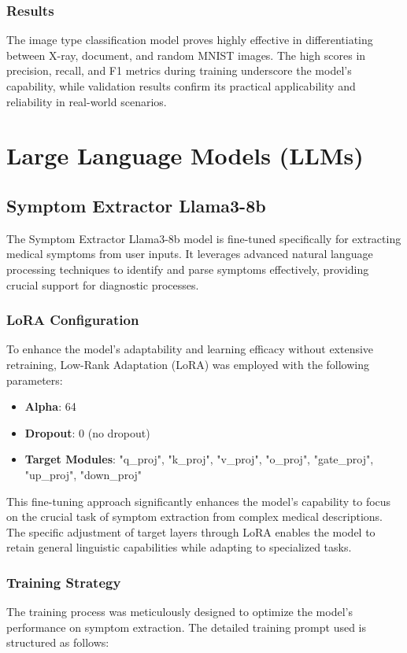 \subsubsection{Results}

The image type classification model proves highly effective in differentiating between X-ray, document, and random MNIST images. The high scores in precision, recall, and F1 metrics during training underscore the model's capability, while validation results confirm its practical applicability and reliability in real-world scenarios.

\section{Large Language Models (LLMs)}

\subsection{Symptom Extractor Llama3-8b}

The Symptom Extractor Llama3-8b model is fine-tuned specifically for extracting medical symptoms from user inputs. It leverages advanced natural language processing techniques to identify and parse symptoms effectively, providing crucial support for diagnostic processes.


\subsubsection{LoRA Configuration}
To enhance the model's adaptability and learning efficacy without extensive retraining, Low-Rank Adaptation (LoRA) was employed with the following parameters:
\begin{itemize}
    \item \textbf{Alpha}: 64
    \item \textbf{Dropout}: 0 (no dropout)
    \item \textbf{Target Modules}: "q\_proj", "k\_proj", "v\_proj", "o\_proj", "gate\_proj", "up\_proj", "down\_proj"
\end{itemize}

This fine-tuning approach significantly enhances the model’s capability to focus on the crucial task of symptom extraction from complex medical descriptions. The specific adjustment of target layers through LoRA enables the model to retain general linguistic capabilities while adapting to specialized tasks.

\subsubsection{Training Strategy}
The training process was meticulously designed to optimize the model's performance on symptom extraction. The detailed training prompt used is structured as follows:

